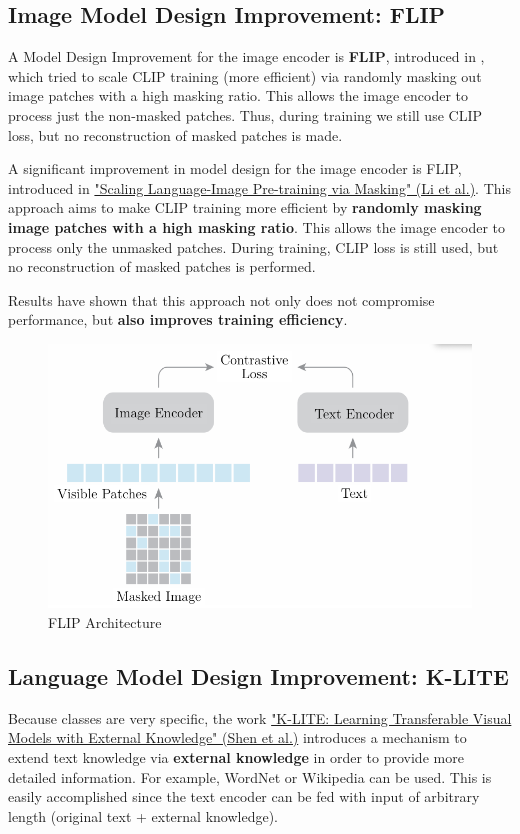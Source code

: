 \subsection{Image Model Design Improvement: FLIP}



A Model Design Improvement for the image encoder is \textbf{FLIP}, introduced in , which tried to scale CLIP training (more efficient) via randomly masking out image patches with a high masking ratio. This allows the image encoder to process just the non-masked patches. Thus, during training we still use CLIP loss, but no reconstruction of masked patches is made.

A significant improvement in model design for the image encoder is FLIP, introduced in \href{https://arxiv.org/pdf/2212.00794}{"Scaling Language-Image Pre-training via Masking" (Li et al.)}. This approach aims to make CLIP training more efficient by \textbf{randomly masking image patches with a high masking ratio}. This allows the image encoder to process only the unmasked patches. During training, CLIP loss is still used, but no reconstruction of masked patches is performed.

Results have shown that this approach not only does not compromise performance, but \textbf{also improves training efficiency}.

\begin{figure}[!htbp]
    \centering
    \includegraphics[width=0.8\linewidth]{tikz/chapter11 - FLIP.pdf}
    \caption{FLIP Architecture}
\end{figure}

\subsection{Language Model Design Improvement: K-LITE}

Because classes are very specific, the work \href{https://arxiv.org/pdf/2204.09222}{"K-LITE: Learning Transferable Visual Models with External Knowledge" (Shen et al.)} introduces a mechanism to extend text knowledge via \textbf{external knowledge} in order to provide more detailed information. For example, WordNet or Wikipedia can be used. This is easily accomplished since the text encoder can be fed with input of arbitrary length (original text + external knowledge).

